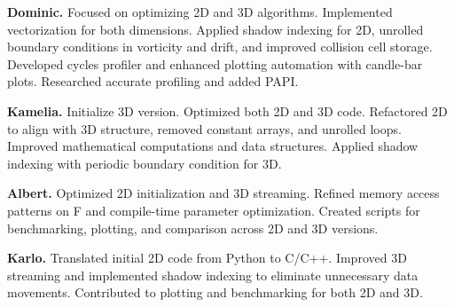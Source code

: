 \documentclass[letterpaper]{article}
\newcommand{\mypar}[1]{{\bf #1.}}
\begin{document}
\mypar{Dominic}
Focused on optimizing 2D and 3D algorithms. Implemented vectorization for both dimensions. Applied shadow indexing for 2D, unrolled boundary conditions in vorticity and drift, and improved collision cell storage. Developed cycles profiler and enhanced plotting automation with candle-bar plots. Researched accurate profiling and added PAPI.

\mypar{Kamelia}
Initialize 3D version. Optimized both 2D and 3D code. Refactored 2D to align with 3D structure, removed constant arrays, and unrolled loops. Improved mathematical computations and data structures. Applied shadow indexing with periodic boundary condition for 3D.

\mypar{Albert}
Optimized 2D initialization and 3D streaming. Refined memory access patterns on F and compile-time parameter optimization. Created scripts for benchmarking, plotting, and comparison across 2D and 3D versions.

\mypar{Karlo}
Translated initial 2D code from Python to C/C++. Improved 3D streaming and implemented shadow indexing to eliminate unnecessary data movements. Contributed to plotting and benchmarking for both 2D and 3D.


\newpage

\balance


\end{document}
